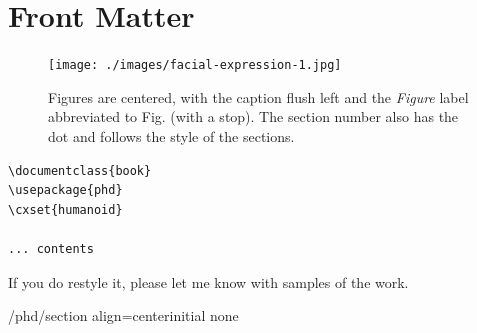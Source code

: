\section{Front Matter}
\begin{figure}[ht]
\centering
\texttt{[image: ./images/facial-expression-1.jpg]}
\caption{Figures are centered, with the caption flush left and the \textit{Figure} label abbreviated to Fig. (with a stop). The section number also has the dot and follows the style of the sections.}
\label{fig:eight02}
\end{figure}


\begin{verbatim}
\documentclass{book}
\usepackage{phd}
\cxset{humanoid}

... contents

\end{verbatim}

If you do restyle it, please let me know with samples of the work.

\begin{key}{/phd/section align=center}{initial none}

\end{key}



